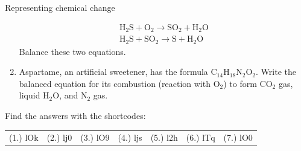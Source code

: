 \begin{eocexercises}{Representing chemical change}
\begin{enumerate}[noitemsep, label=\textbf{\arabic*}. ]
\begin{eqnarray*}
{\text{H}}_{2}\text{S} + {\text{O}}_{2} \to {\text{SO}}_{2} + {\text{H}}_{2}\text{O} \\ 
{\text{H}}_{2}\text{S} + {\text{SO}}_{2} \to \text{S} + {\text{H}}_{2}\text{O} 
      \end{eqnarray*}
Balance these two equations.
\label{m38727*uid46}\item Aspartame, an artificial sweetener, has the formula ${\text{C}}_{14}{\text{H}}_{18}{\text{N}}_{2}{\text{O}}_{2}$. Write the balanced equation for its combustion (reaction with ${\text{O}}_{2}$) to form ${\text{CO}}_{2}$ gas, liquid $\text{H}_{2}\text{O}$, and ${\text{N}}_{2}$ gas.
\end{enumerate}
  \label{m38727**end}
  \label{337cc49099d6e82169c54b5d0fc3878f**end}
\par {} Find the answers with the shortcodes:
 \par \begin{tabular}[h]{cccccc}
 (1.) lOk  &  (2.) lj0  &  (3.) lO9  &  (4.) ljs  &  (5.) l2h  &  (6.) lTq  &  (7.) lO0  & \end{tabular}
\end{eocexercises}
